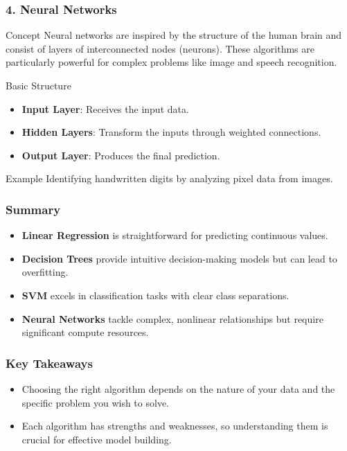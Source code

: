 \documentclass{beamer}
\begin{document}
\begin{frame}[fragile]
    \frametitle{4. Neural Networks}
    \begin{block}{Concept}
        Neural networks are inspired by the structure of the human brain and consist of layers of interconnected nodes (neurons). These algorithms are particularly powerful for complex problems like image and speech recognition.
    \end{block}

    \begin{block}{Basic Structure}
        \begin{itemize}
            \item \textbf{Input Layer}: Receives the input data.
            \item \textbf{Hidden Layers}: Transform the inputs through weighted connections.
            \item \textbf{Output Layer}: Produces the final prediction.
        \end{itemize}
    \end{block}

    \begin{block}{Example}
        Identifying handwritten digits by analyzing pixel data from images.
    \end{block}
\end{frame}

\begin{frame}[fragile]
    \frametitle{Summary}
    \begin{itemize}
        \item \textbf{Linear Regression} is straightforward for predicting continuous values.
        \item \textbf{Decision Trees} provide intuitive decision-making models but can lead to overfitting.
        \item \textbf{SVM} excels in classification tasks with clear class separations.
        \item \textbf{Neural Networks} tackle complex, nonlinear relationships but require significant compute resources.
    \end{itemize}
\end{frame}

\begin{frame}[fragile]
    \frametitle{Key Takeaways}
    \begin{itemize}
        \item Choosing the right algorithm depends on the nature of your data and the specific problem you wish to solve.
        \item Each algorithm has strengths and weaknesses, so understanding them is crucial for effective model building.
    \end{itemize}
\end{frame}
\end{document}
